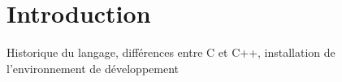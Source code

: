 \chapter{Introduction}

Historique du langage, différences entre C et C++, installation de l'environnement de développement